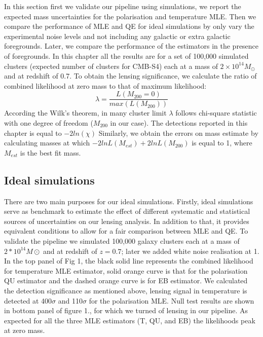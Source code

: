  In this section first we validate our pipeline using simulations, we report the expected mass uncertainties for the polarisation and temperature MLE. 
 Then we compare the performance of MLE and QE for ideal simulations by only vary the experimental noise levels and not including any galactic or extra galactic foregrounds. 
 Later, we compare the performance of the estimators in the presence of foregrounds. 
 In this chapter all the results are for a set of 100,000 simulated clusters (expected number of clusters for CMB-S4) each at a mass of $2\times10^{14} M_{\odot}$ and at redshift of 0.7.
 To obtain the lensing significance, we calculate the ratio of combined likelihood at zero mass to that of maximum likelihood:
 \begin{equation}
 \lambda = \frac{L (M_{200} =0)}{max(L(M_{200}))}
 \end{equation} 
 According the Wilk's theorem, in many cluster limit $\lambda $ follows chi-square statistic with one degree of freedom ($M_{200}$ in our case).
 The detections reported in this chapter is equal to $-2 ln (\chi)$
 Similarly, we obtain the errors on mass estimate by calculating masses at which $-2lnL(M_{est}) + 2 ln L (M_{200})$ is equal to 1, where $M_{est}$ is the best fit mass.
 
 
 \subsection{Ideal simulations}
 There are two main purposes for our ideal simulations. 
 Firstly, ideal simulations serve as benchmark to estimate the effect of different systematic and statistical sources of uncertainties on our lensing analysis. 
 In addition to that, it provides equivalent conditions to allow for a fair comparison between MLE and QE.
 To validate the pipeline we simulated 100,000 galaxy clusters each at a mass of $2*10^{14} M{\odot}$ and at redshift of $z = 0.7$; later we added white noise realisation at 1\ukam.
 In the top panel of Fig 1, the black solid line represents the combined likelihood for temperature MLE estimator, solid orange curve is that for the polarisation QU estimator and the dashed orange curve is for EB estimator. 
 We calculated the detection significance as mentioned above, lensing signal in temperature is detected at 400$\sigma$ and 110$\sigma$ for the polarisation MLE. 
 Null test results are shown in bottom panel of figure 1., for which we turned of lensing in our pipeline.
 As expected for all the three MLE estimators (T, QU, and EB) the likelihoods peak at zero mass.
 
